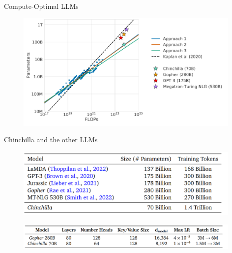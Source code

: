 
\begin{vbframe}{Compute-Optimal LLM\MakeLowercase{s}}

\vfill

\begin{figure}
	\centering
	\includegraphics[width = 11cm]{./figure/chinchilla.png} \\ 
\end{figure}

\vfill

\end{vbframe}


\begin{vbframe}{Chinchilla and the other LLM\MakeLowercase{s}}

\vfill

\begin{figure}
	\centering
	\includegraphics[width = 11cm]{./figure/llm_params.png} \\ 
\end{figure}

\begin{figure}
	\centering
	\includegraphics[width = 11cm]{./figure/chinchilla_gopher.png} \\ 
\end{figure}

\vfill

\end{vbframe}

